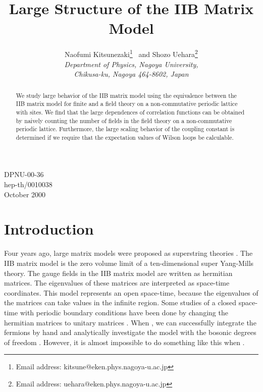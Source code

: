 \documentclass[12pt,a4paper]{article}
\begin{document}
\title{Large \coordHE{} Structure of the IIB Matrix Model}
\author{{\sc Naofumi Kitsunezaki}\thanks{Email address:
kitsune@eken.phys.nagoya-u.ac.jp} ~and
{\sc Shozo Uehara}\thanks{Email address:
uehara@eken.phys.nagoya-u.ac.jp}\vspace{4mm}\\
{\it Department of Physics, Nagoya University,}\\
{\it Chikusa-ku, Nagoya 464-8602, Japan}}
\date{}
\maketitle
\vspace{-70mm}
\begin{flushright}
	DPNU-00-36\\
	hep-th/0010038\\
	October 2000
\end{flushright}
\vspace{50mm}

\begin{abstract}
We study large \coordHE{} behavior of the IIB matrix model using the
equivalence between the IIB matrix model for finite \coordHE{} and a field
theory on a non-commutative periodic lattice with \coordHE{} sites.
We find that the large \coordHE{} dependences of correlation functions can be
obtained by naively counting the number of fields in the field
theory on a non-commutative periodic lattice.
Furthermore, the large \coordHE{} scaling behavior of the coupling constant
\coordHE{} is determined if we require that the expectation values of
Wilson loops be calculable.
\end{abstract}

\section{Introduction}
Four years ago, large \coordHE{} matrix models were proposed as
superstring theories \cite{BFSS,IKKT,FKKT,AIKKT}.
The IIB matrix model \cite{IKKT} is the zero volume limit \cite{EK} of
a ten-dimensional super Yang-Mills theory.
The gauge fields in the IIB matrix model are written as \coordHE{}
hermitian matrices.
The eigenvalues of these matrices are interpreted as space-time
coordinates. This model represents an open space-time, because the
eigenvalues of the matrices can take values in the infinite region.
Some studies of a closed space-time with periodic boundary conditions
have been done by changing the hermitian matrices to unitary matrices
\cite{KN}. When \coordHE{}, we can successfully integrate the fermions by
hand and analytically investigate the model with the bosonic degrees
of freedom \cite{TsuSu}. However, it is almost impossible to do
something like this when \coordHE{}.
\end{document}
